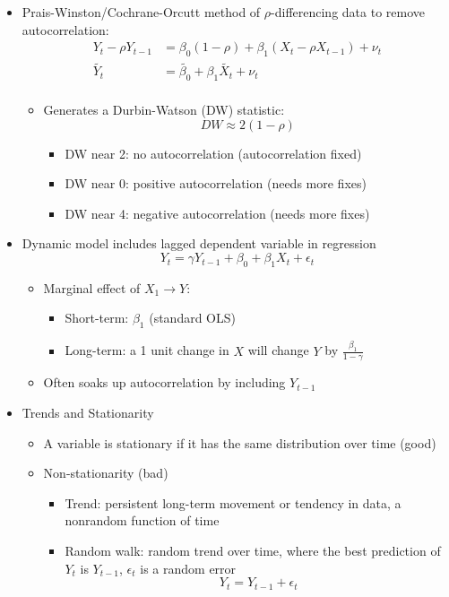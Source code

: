 \documentclass{article}
\begin{document}
\begin{itemize}
\begin{itemize}
  		\end{itemize} 
  		\item Prais-Winston/Cochrane-Orcutt method of $\rho$-differencing data to remove autocorrelation:
\begin{align*}
		Y_t - \rho Y_{t-1} &= \beta_0(1-\rho) + \beta_1(X_t - \rho X_{t-1}) + \nu_t \\
		\tilde{Y_t} &= \tilde{\beta_0} + \beta_1 \tilde{X_t} + \nu_t\\
		\end{align*}
		\begin{itemize}
			\item Generates a Durbin-Watson (DW) statistic:
					\begin{equation*}
		DW\approx 2(1-\rho)	
		\end{equation*}
		\begin{itemize}
		\item DW near 2: no autocorrelation (autocorrelation fixed)
		\item DW near 0: positive autocorrelation (needs more fixes)
		\item DW near 4: negative autocorrelation (needs more fixes)
		\end{itemize} 
	\end{itemize}
	\item Dynamic model includes lagged dependent variable in regression
		\begin{equation*}
		Y_t=\gamma Y_{t-1} + \beta_0+\beta_1 X_t + \epsilon_t
	\end{equation*}
	\begin{itemize}
		\item Marginal effect of $X_1 \rightarrow Y$:
		\begin{itemize}
			\item Short-term: $\beta_1$ (standard OLS)
			\item Long-term: a 1 unit change in $X$ will change $Y$ by $\frac{\beta_1}{1-\gamma}$ 
		\end{itemize}
		\item Often soaks up autocorrelation by including $Y_{t-1}$
	\end{itemize}
	\item Trends and Stationarity
	\begin{itemize}
		\item A variable is stationary if it has the same distribution over time (good)
		\item Non-stationarity (bad)
		\begin{itemize}
			\item Trend: persistent long-term movement or tendency in data, a nonrandom function of time
			\item Random walk: random trend over time, where the best prediction of $Y_t$ is $Y_{t-1}$, $\epsilon_t$ is a random error 
			\begin{equation*}
			Y_t	=Y_{t-1}+\epsilon_t
			\end{equation*}
			

\end{itemize}
\end{itemize}
\end{itemize}
\end{document}
